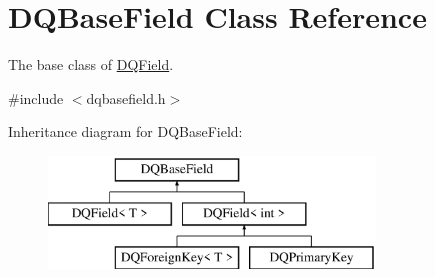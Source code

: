 \hypertarget{classDQBaseField}{
\section{DQBaseField Class Reference}
\label{classDQBaseField}
}


The base class of \hyperlink{classDQField}{DQField}.  




{\ttfamily \#include $<$dqbasefield.h$>$}

Inheritance diagram for DQBaseField:\begin{figure}[H]
\begin{center}
\leavevmode
\includegraphics[height=3.000000cm]{classDQBaseField}
\end{center}
\end{figure}
